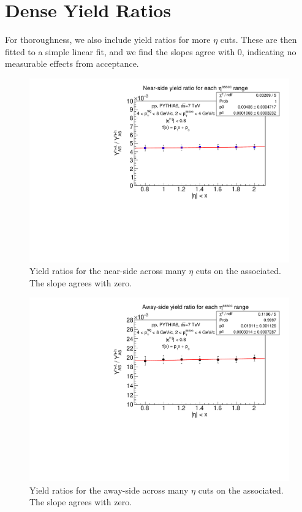 \documentclass[../main.tex]{subfiles}
\begin{document}
\clearpage
\chapter{Dense Yield Ratios} \label{appendix:b}
For thoroughness, we also include yield ratios for more $\eta$ cuts. These are then fitted to a simple linear fit, and we find the slopes agree with 0, indicating no measurable effects from acceptance. 

\begin{figure}[h]
    \centering
    \includegraphics[scale=0.45]{appendix/figs/dense_yield_near.pdf}
    \caption{Yield ratios for the near-side across many $\eta$ cuts on the associated. The slope agrees with zero. }
    \label{fig:enter-label}
\end{figure}

\begin{figure}[h]
    \centering
    \includegraphics[scale=0.45]{appendix/figs/dense_yield_away.pdf}
    \caption{Yield ratios for the away-side across many $\eta$ cuts on the associated. The slope agrees with zero. }
    \label{fig:enter-label}
\end{figure}
\end{document}
